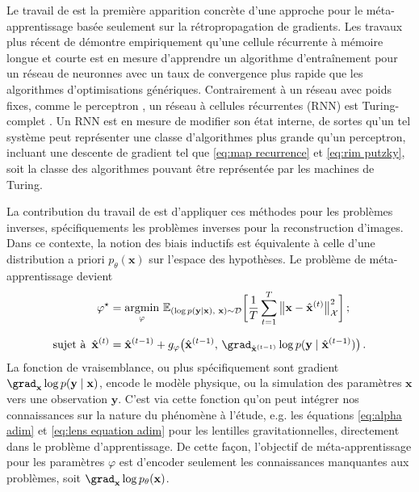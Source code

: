 Le travail de \citet{Younger2001} est la première apparition concrète d'une approche pour le méta-apprentissage 
basée seulement sur la rétropropagation de gradients.
Les travaux plus récent de \citet{Andrychowicz2016} 
démontre empiriquement qu'une cellule récurrente à mémoire longue et courte \citep[LSTM,][]{Hochreiter1997} est en mesure d'apprendre 
un algorithme d'entraînement pour un réseau de neuronnes avec un taux de convergence plus rapide que les algorithmes d'optimisations génériques.
Contrairement à un réseau avec poids fixes, comme le perceptron \citep{Rosenblatt1958}, 
un réseau à cellules récurrentes (RNN) est Turing-complet \citep{Siegelmann1992}.
Un RNN est en mesure de modifier son état interne, de sortes qu'un tel système peut représenter une classe d'algorithmes plus grande qu'un perceptron, 
incluant une descente de gradient tel que \eqref{eq:map recurrence} et \eqref{eq:rim putzky}, 
soit la classe des algorithmes pouvant être représentée par les machines de Turing.

La contribution du travail de \citet{Putzky2017} est d'appliquer ces méthodes pour les problèmes inverses, spécifiquements les 
problèmes inverses pour la reconstruction d'images. Dans ce contexte, la notion des biais inductifs est 
équivalente à celle d'une distribution a priori $p_\theta(\mathbf{x})$ sur l'espace 
des hypothèses. Le problème de méta-apprentissage devient
\begin{equation}\label{eq:loss intro}
        \begin{aligned}
                \varphi^{\star} &= \underset{\varphi}{\mathrm{argmin}}\,\, 
        \mathbb{E}_{(\log p(\mathbf{y} \mid \mathbf{x}),\,\, \mathbf{x}) \sim \mathcal{D}} 
        \bigg[ \frac{1}{T} \sum_{t=1}^{T} \big\lVert \mathbf{x} - \hat{\mathbf{x}}^{(t)} \big\rVert^{2}_{\mathcal{X}}  \bigg]\,; \\[1.5ex]
        \text{sujet à}\,\,\,\hat{\mathbf{x}}^{(t)} &= 
        \hat{\mathbf{x}}^{(t-1)} + g_\varphi\big(\hat{\mathbf{x}}^{(t-1)},\, \grad_{\hat{\mathbf{x}}^{(t-1)}} \log p(\mathbf{y} \mid \hat{\mathbf{x}}^{(t-1)}) \big)\, .
        \end{aligned}
\end{equation} 
La fonction de vraisemblance, ou plus spécifiquement sont gradient $\grad_{\mathbf{x}}\log p(\mathbf{y} \mid \mathbf{x})$, 
encode le modèle physique, ou la simulation des paramètres $\mathbf{x}$ vers une observation $\mathbf{y}$.
C'est via cette fonction qu'on peut intégrer nos connaissances sur la nature du phénomène à l'étude, e.g. les équations \eqref{eq:alpha adim} et \eqref{eq:lens equation adim} 
pour les lentilles gravitationnelles, directement dans le problème d'apprentissage.
De cette façon, l'objectif de méta-apprentissage pour les paramètres $\varphi$ est d'encoder seulement 
les connaissances manquantes aux problèmes, soit $\grad_{\mathbf{x}}\log p_\theta(\mathbf{x})$.

